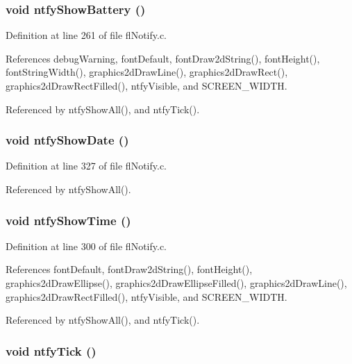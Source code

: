 \subsubsection{\setlength{\rightskip}{0pt plus 5cm}void ntfy\-Show\-Battery ()}\label{flNotify_8h_4dc9a519cd973d1b8f9672d709f7471e}




Definition at line 261 of file fl\-Notify.c.

References debug\-Warning, font\-Default, font\-Draw2d\-String(), font\-Height(), font\-String\-Width(), graphics2d\-Draw\-Line(), graphics2d\-Draw\-Rect(), graphics2d\-Draw\-Rect\-Filled(), ntfy\-Visible, and SCREEN\_\-WIDTH.

Referenced by ntfy\-Show\-All(), and ntfy\-Tick().
\subsubsection{\setlength{\rightskip}{0pt plus 5cm}void ntfy\-Show\-Date ()}\label{flNotify_8h_d4ad320596b2f405aae8dffff7ee9f47}




Definition at line 327 of file fl\-Notify.c.

Referenced by ntfy\-Show\-All().
\subsubsection{\setlength{\rightskip}{0pt plus 5cm}void ntfy\-Show\-Time ()}\label{flNotify_8h_b820d2dca060b648b4c51bdc592c2d95}




Definition at line 300 of file fl\-Notify.c.

References font\-Default, font\-Draw2d\-String(), font\-Height(), graphics2d\-Draw\-Ellipse(), graphics2d\-Draw\-Ellipse\-Filled(), graphics2d\-Draw\-Line(), graphics2d\-Draw\-Rect\-Filled(), ntfy\-Visible, and SCREEN\_\-WIDTH.

Referenced by ntfy\-Show\-All(), and ntfy\-Tick().
\subsubsection{\setlength{\rightskip}{0pt plus 5cm}void ntfy\-Tick ()}\label{flNotify_8h_7aeb64804d2b67f5d68a9e737a8c929b}




